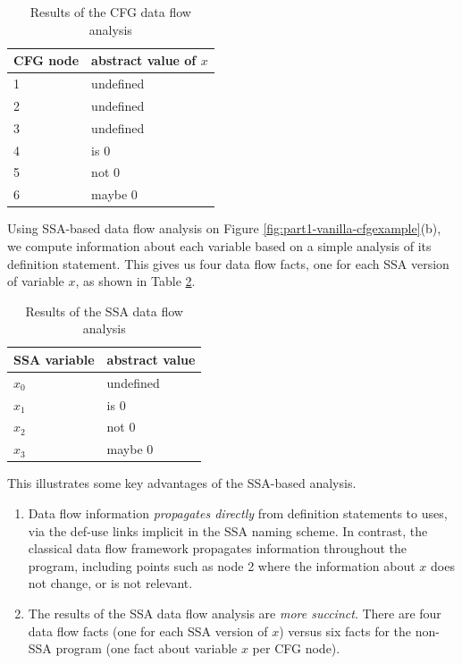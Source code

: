 \begin{table}
\begin{center}
\begin{tabular}{l|l} \hline
CFG node & abstract value of $x$ \\ \hline
1 & undefined \\
2 & undefined \\
3 & undefined \\
4 & is 0 \\
5 & not 0 \\
6 & maybe 0 \\ \hline
\end{tabular}
\end{center}
\caption{\label{tab:part1-vanilla-cfgres}Results of the CFG data flow analysis}
\end{table}

Using SSA-based data flow analysis on Figure 
\ref{fig:part1-vanilla-cfgexample}(b),
we compute information about each variable based on a simple
analysis of its definition statement. This gives us four data flow facts,
one for each SSA version of variable $x$, as shown in Table
\ref{tab:part1-vanilla-ssares}.

\begin{table}
\begin{center}
\begin{tabular}{l|l} \hline
SSA variable & abstract value \\ \hline
$x_0$ & undefined \\
$x_1$ & is 0 \\
$x_2$ & not 0 \\
$x_3$ & maybe 0 \\ \hline
\end{tabular}
\end{center}
\caption{\label{tab:part1-vanilla-ssares}Results of the SSA data flow
  analysis}
\end{table}


This illustrates some key advantages of the SSA-based analysis.
\begin{enumerate}
\item Data flow information
\textit{propagates directly}
from definition statements to uses, via
the def-use links implicit in the SSA naming scheme. 
In contrast, the 
classical data flow framework 
propagates information throughout the program,
including points such as node 2 where the information 
about $x$ does not change, or is not relevant.
\item The results of the SSA data flow analysis are
\textit{more succinct}.
There are four data flow facts (one for each SSA version of $x$)
versus six facts for the non-SSA program (one fact about variable $x$
per CFG node).
\end{enumerate}

